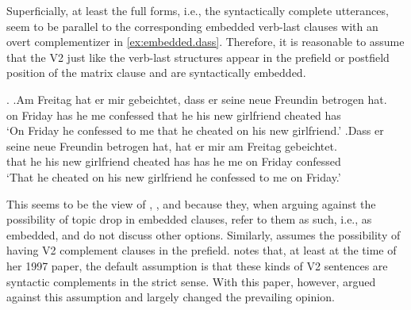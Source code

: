 Superficially, at least the full forms, i.e., the syntactically complete utterances, seem to be parallel to the corresponding embedded verb-last clauses with an overt complementizer  in \ref{ex:embedded.dass}.
Therefore, it is reasonable to assume that the V2 just like the verb-last structures appear in the prefield or postfield position of the matrix clause and are syntactically embedded.

\ex.\label{ex:embedded.dass}
\ag.\label{ex:embedded.final.dass}Am Freitag hat er mir gebeichtet, dass er seine neue Freundin betrogen hat.\\
on Friday has he me confessed that he his new girlfriend cheated has\\
`On Friday he confessed to me that he cheated on his new girlfriend.'
\bg.\label{ex:embedded.initial.dass}Dass er seine neue Freundin betrogen hat, hat er mir am Freitag gebeichtet.\\
that he his new girlfriend cheated has has he me on Friday confessed\\
`That he cheated on his new girlfriend he confessed to me on Friday.'

This seems to be the view of \citet{cardinaletti1990}, \citet{rizzi1994}, and \citet{volodina2011} because they, when arguing against the possibility of topic drop in embedded clauses, refer to them as such, i.e., as embedded, and do not discuss other options.
Similarly, \citet[253--254]{grewendorf1988} assumes the possibility of having V2 complement clauses  in the prefield.
\citet[138]{reis1997} notes that, at least at the time of her 1997 paper, the default assumption is that these kinds of V2 sentences are syntactic complements in the strict sense.
With this paper, however, \citet{reis1997} argued against this assumption and largely changed the prevailing opinion.

